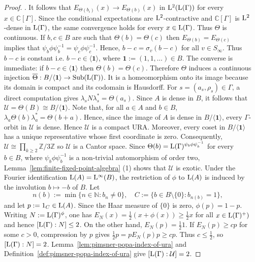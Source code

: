 \documentclass[12pt]{amsart} %
\theoremstyle{plain}
\theoremstyle{definition}
\newcommand{\N}{\mathbb{N}}
\newcommand{\Z}{\mathbb{Z}}
\newcommand{\LL}{{\rm L}}
\DeclareMathOperator{\Sub}{Sub}
\begin{document}
\begin{proof}
. It follows that $E_{\Theta(b_i)}(x)\longrightarrow E_{\Theta(b)}(x)$
in $\LL^2(\LL(\Gamma))$ for every $x\in\mathbb C[\Gamma]$. Since the
conditional expectations are $\LL^2$-contractive and
$\mathbb C[\Gamma]$ is $\LL^2$-dense in $\LL(\Gamma)$, the same convergence
holds for every $x\in\LL(\Gamma)$. Thus $\Theta$ is continuous.
\medskip
\noindent If $b,c\in B$ are such that $\Theta(b)=\Theta(c)$ then $E_{\Theta(b)}=E_{\Theta(c)}$ implies that $\psi_b\phi\psi_b^{-1}=\psi_c\phi\psi_c^{-1}$. Hence, $b-c=\sigma_v(b-c)$ for all $v\in S_\infty$. Thus $b-c$ is constant i.e. $b-c\in\langle\mathbf1\rangle$, where $\mathbf1:=(1,1,\dots)\in B$. The converse is immediate: if $b-c\in\langle\mathbf1\rangle$ then $\Theta(b)=\Theta(c)$. Therefore $\Theta$
induces a continuous injection $\overline\Theta:B/\langle\mathbf1\rangle\to\Sub(\LL(\Gamma))$. It is a homeomorphism onto its image because its domain is compact and its
codomain is Hausdorff. For $s=(a_s,\rho_s)\in\Gamma$, a direct computation gives $\lambda_sN\lambda_s^*=\Theta(a_s)$.
Since $A$ is dense in $B$, it follows that $\mathcal U=\Theta(B)\cong B/\langle\mathbf1\rangle$. Note that, for all $a\in A$ and $b\in B$,
$\lambda_a\Theta(b)\lambda_a^*=\Theta(b+a)$. Hence, since the image of $A$ is dense in $B/\langle\mathbf1\rangle$, every
$\Gamma$-orbit in $\mathcal U$ is dense. Hence $\mathcal U$ is a compact URA. Moreover, every coset in $B/\langle\mathbf1\rangle$ has a unique representative whose
first coordinate is zero. Consequently, $\mathcal U\cong\prod_{k\geq2}\Z/3\Z$ so $\mathcal U$ is a Cantor space. Since $\Theta(b)=\LL(\Gamma)^{\psi_b\phi\psi_b^{-1}}$ for every $b\in B$,
where $\psi_b\phi\psi_b^{-1}$ is a non-trivial automorphism of order two, Lemma~\ref{lem:finite-fixed-point-algebra} {\rm(1)} shows that $\mathcal U$ is exotic.
\medskip
\noindent Under the Fourier identification $\LL(A)=\LL^\infty(B)$, the
restriction of $\phi$ to $\LL(A)$ is induced by the involution
$b\mapsto-b$ of $B$. Let
$$
n(b):=\min\{n\in\N:b_n\neq0\},
\quad
C:=\{b\in B\setminus\{0\}:b_{n(b)}=1\},
$$
and let $p:=1_C\in\LL(A)$. Since the Haar measure of $\{0\}$ is zero,
$\phi(p)=1-p$. Writing $N:=\LL(\Gamma)^\phi$, one has
$E_N(x)=\frac12(x+\phi(x))\geq\frac12x$ for all $x\in\LL(\Gamma)^+)$ and hence $[\LL(\Gamma):N]\leq2$. On the other hand,
$E_N(p)=\frac12 1$. If $E_N(p)\geq cp$ for some $c>0$, compression by $p$
gives $\frac12p=pE_N(p)p\geq cp$. Thus $c\leq\frac12$, so $[\LL(\Gamma):N]=2$. Lemma~\ref{lem:pimsner-popa-index-of-ura}
and Definition~\ref{def:pimsner-popa-index-of-ura} give
$[\LL(\Gamma):\mathcal U]=2$.
\end{proof}
\end{document}
